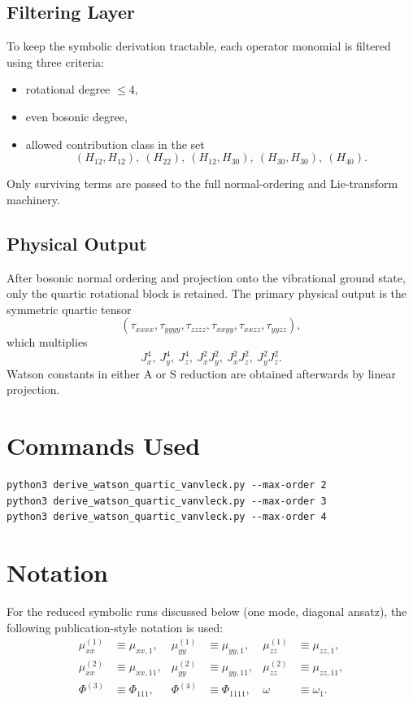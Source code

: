 \documentclass[11pt,a4paper]{article}
\begin{document}
\subsection{Filtering Layer}
To keep the symbolic derivation tractable, each operator monomial is filtered using three
criteria:
\begin{itemize}
\item rotational degree \(\le 4\),
\item even bosonic degree,
\item allowed contribution class in the set
\[
(H_{12},H_{12}),\ (H_{22}),\ (H_{12},H_{30}),\ (H_{30},H_{30}),\ (H_{40}).
\]
\end{itemize}
Only surviving terms are passed to the full normal-ordering and Lie-transform machinery.

\subsection{Physical Output}
After bosonic normal ordering and projection onto the vibrational ground state,
only the quartic rotational block is retained. The primary physical output is the symmetric
quartic tensor
\begin{equation}
(\tau_{xxxx},\tau_{yyyy},\tau_{zzzz},\tau_{xxyy},\tau_{xxzz},\tau_{yyzz}),
\end{equation}
which multiplies
\begin{equation}
J_x^4,\ J_y^4,\ J_z^4,\ J_x^2J_y^2,\ J_x^2J_z^2,\ J_y^2J_z^2.
\end{equation}
Watson constants in either A or S reduction are obtained afterwards by linear projection.

\section{Commands Used}
\begin{lstlisting}
python3 derive_watson_quartic_vanvleck.py --max-order 2
python3 derive_watson_quartic_vanvleck.py --max-order 3
python3 derive_watson_quartic_vanvleck.py --max-order 4
\end{lstlisting}

\section{Notation}
For the reduced symbolic runs discussed below (one mode, diagonal ansatz), the following
publication-style notation is used:
\begin{align}
\mu_{xx}^{(1)} &\equiv \mu_{xx,1}, &
\mu_{yy}^{(1)} &\equiv \mu_{yy,1}, &
\mu_{zz}^{(1)} &\equiv \mu_{zz,1},\\
\mu_{xx}^{(2)} &\equiv \mu_{xx,11}, &
\mu_{yy}^{(2)} &\equiv \mu_{yy,11}, &
\mu_{zz}^{(2)} &\equiv \mu_{zz,11},\\
\Phi^{(3)} &\equiv \Phi_{111}, &
\Phi^{(4)} &\equiv \Phi_{1111}, &
\omega &\equiv \omega_1.
\end{align}
\end{document}
